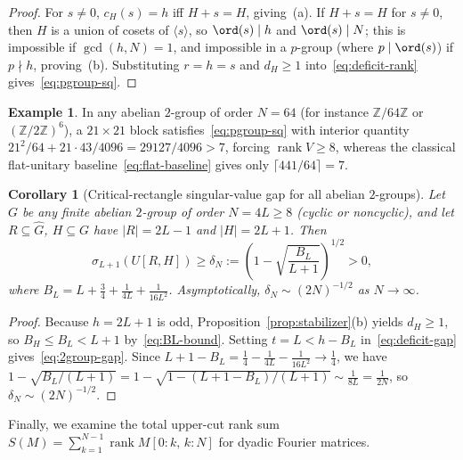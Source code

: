 \documentclass[11pt,reqno]{amsart}
\numberwithin{equation}{section}
\newtheorem{corollary}[theorem]{Corollary}
\theoremstyle{definition}
\newtheorem{example}[theorem]{Example}
\theoremstyle{remark}
\newcommand{\Z}{\mathbb{Z}}
\newcommand{\rank}{\operatorname{rank}}
\begin{document}
\begin{proof}
For $s\neq 0$, $c_H(s)=h$ iff $H+s=H$, giving~(a). If $H+s=H$ for $s\neq 0$, then $H$ is a union of cosets of $\langle s\rangle$, so $\ord(s)\mid h$ and $\ord(s)\mid N$; this is impossible if $\gcd(h,N)=1$, and impossible in a $p$-group (where $p\mid\ord(s)$) if $p\nmid h$, proving~(b). Substituting $r=h=s$ and $d_H\ge 1$ into~\eqref{eq:deficit-rank} gives~\eqref{eq:pgroup-sq}.
\end{proof}

\begin{example}
In any abelian $2$-group of order $N=64$ (for instance $\Z/64\Z$ or $(\Z/2\Z)^6$), a $21\times 21$ block satisfies~\eqref{eq:pgroup-sq} with interior quantity $21^2/64 + 21\cdot 43/4096 = 29127/4096 > 7$, forcing $\rank V \ge 8$, whereas the classical flat-unitary baseline~\eqref{eq:flat-baseline} gives only $\lceil 441/64\rceil = 7$.
\end{example}

\begin{corollary}[Critical-rectangle singular-value gap for all abelian $2$-groups]
\label{cor:2group-gap}
Let $G$ be \emph{any} finite abelian $2$-group of order $N=4L\ge 8$ (cyclic or noncyclic), and let $R\subseteq\widehat{G}$, $H\subseteq G$ have $|R|=2L-1$ and $|H|=2L+1$. Then
\begin{equation}
\label{eq:2group-gap}
\sigma_{L+1}(U[R,H]) \ge \delta_N := \left(1 - \sqrt{\frac{B_L}{L+1}}\right)^{1/2} > 0,
\end{equation}
where $B_L = L + \frac{3}{4} + \frac{1}{4L} + \frac{1}{16L^2}$. Asymptotically, $\delta_N \sim (2N)^{-1/2}$ as $N\to\infty$.
\end{corollary}

\begin{proof}
Because $h=2L+1$ is odd, Proposition~\ref{prop:stabilizer}(b) yields $d_H\ge 1$, so $B_H \le B_L < L+1$ by~\eqref{eq:BL-bound}. Setting $t=L < h - B_L$ in~\eqref{eq:deficit-gap} gives~\eqref{eq:2group-gap}. Since $L+1-B_L = \frac{1}{4} - \frac{1}{4L} - \frac{1}{16L^2} \to \frac{1}{4}$, we have $1 - \sqrt{B_L/(L+1)} = 1 - \sqrt{1 - (L+1-B_L)/(L+1)} \sim \frac{1}{8L} = \frac{1}{2N}$, so $\delta_N\sim (2N)^{-1/2}$.
\end{proof}

Finally, we examine the total upper-cut rank sum $S(M) = \sum_{k=1}^{N-1}\rank M[0{:}k,\, k{:}N]$ for dyadic Fourier matrices.
\end{document}
